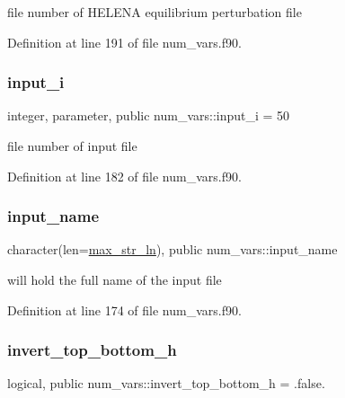 file number of H\+E\+L\+E\+NA equilibrium perturbation file 



Definition at line 191 of file num\+\_\+vars.\+f90.

\mbox{\label{namespacenum__vars_aba3a56e056e4851ee31a33a448613863}} 
\subsubsection{\texorpdfstring{input\+\_\+i}{input\_i}}
{\footnotesize\ttfamily integer, parameter, public num\+\_\+vars\+::input\+\_\+i = 50}



file number of input file 



Definition at line 182 of file num\+\_\+vars.\+f90.

\mbox{\label{namespacenum__vars_a1a16a5fdda7aaacdffd14f1ad29f5e8b}} 
\subsubsection{\texorpdfstring{input\+\_\+name}{input\_name}}
{\footnotesize\ttfamily character(len=\hyperlink{namespacenum__vars_a3ff2bb983ee80a6735277d6789e6ce7c}{max\+\_\+str\+\_\+ln}), public num\+\_\+vars\+::input\+\_\+name}



will hold the full name of the input file 



Definition at line 174 of file num\+\_\+vars.\+f90.

\mbox{\label{namespacenum__vars_a9c579c39602d4a4761335866603aea5f}} 
\subsubsection{\texorpdfstring{invert\+\_\+top\+\_\+bottom\+\_\+h}{invert\_top\_bottom\_h}}
{\footnotesize\ttfamily logical, public num\+\_\+vars\+::invert\+\_\+top\+\_\+bottom\+\_\+h = .false.}



